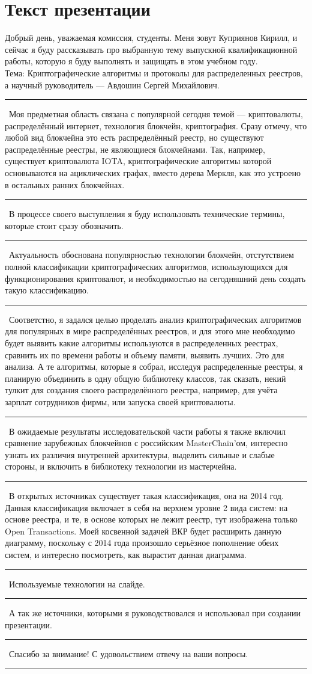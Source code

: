 \documentclass[12pt]{article}
\renewcommand{\line}{\noindent\rule{\textwidth}{1pt}}
\begin{document}
\section*{Текст презентации}

Добрый день, уважаемая комиссия, студенты. Меня зовут Куприянов Кирилл, и
сейчас я буду рассказывать про выбранную тему выпускной квалификационной
работы, которую я буду выполнять и защищать в этом учебном году.\\ Тема:
Криптографические алгоритмы и протоколы для распределенных реестров, а научный
руководитель --- Авдошин Сергей Михайлович.\\
\line\
Моя предметная область связана с популярной сегодня темой --- криптовалюты,
распределённый интернет, технология блокчейн, криптография. Сразу отмечу, что
любой вид блокчейна это есть распределённый реестр, но существуют
распределённые реестры, не являющиеся блокчейнами. Так, например, существует
криптовалюта IOTA, криптографические алгоритмы которой основываются на
ациклических графах, вместо дерева Меркля, как это устроено в остальных ранних
блокчейнах.\\
\line\
В процессе своего выступления я буду использовать технические термины,
которые стоит сразу обозначить.\\
\line\
Актуальность обоснована популярностью технологии блокчейн, отстутствием полной
классификации криптографических алгоритмов, использующихся для функционирования
криптовалют, и необходимостью на сегодняшний день создать такую
классификацию.\\
\line\
Соответстно, я задался целью проделать анализ криптографических алгоритмов для
популярных в мире распределённых реестров, и для этого мне необходимо будет
выявить какие алгоритмы используются в распределенных реестрах, сравнить их по
времени работы и объему памяти, выявить лучших. Это для анализа. А те
алгоритмы, которые я собрал, исследуя распределенные реестры, я планирую
объединить в одну общую библиотеку классов, так сказать, некий тулкит для
создания своего распределённого реестра, например, для учёта зарплат
сотрудников фирмы, или запуска своей криптовалюты.\\
\line\
В ожидаемые результаты исследовательской части работы я также включил сравнение
зарубежных блокчейнов с российским MasterChain'ом, интересно узнать их различия
внутренней архитектуры, выделить сильные и слабые стороны, и включить в
библиотеку технологии из мастерчейна.\\
\line\
В открытых источниках существует такая классификация, она на 2014 год. Данная
классификация включает в себя на верхнем уровне 2 вида систем: на основе реестра, и те, в основе которых не лежит реестр, тут изображена только Open Transactions. Моей косвенной задачей ВКР будет расширить данную диаграмму, поскольку с 2014 года произошло серьёзное пополнение обеих систем, и интересно посмотреть, как вырастит данная диаграмма.\\
\line\
Используемые технологии на слайде.\\
\line\
А так же источники, которыми я руководствовался и использовал при создании презентации.\\
\line\
Спасибо за внимание! С удовольствием отвечу на ваши вопросы.\\
\line\
\end{document}
